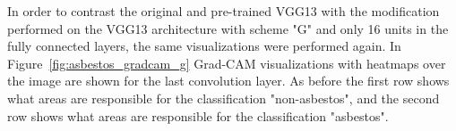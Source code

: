 \begin{figure}[!h]
{}
\label{fig:vgg13_filter_activation}
\end{figure}

In order to contrast the original and pre-trained VGG13 with the modification performed on the VGG13 architecture with scheme "G" and only 16 units in the fully connected layers, the same visualizations were performed again. In Figure~\ref{fig:asbestos_gradcam_g} Grad-CAM visualizations with heatmaps over the image are shown for the last convolution layer. As before the first row shows what areas are responsible for the classification "non-asbestos", and the second row shows what areas are responsible for the classification "asbestos". \\


